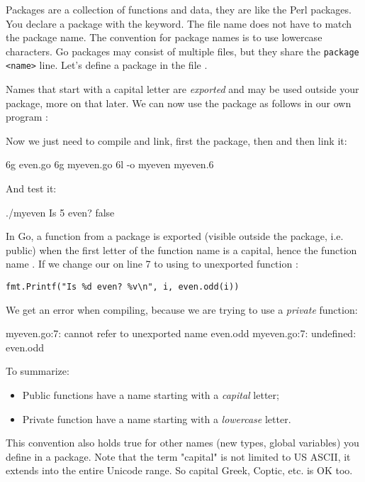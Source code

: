 \noindent{}Packages are a collection of functions and data, they are like the
Perl packages\cite{perl-packages}. You declare a package with the
 keyword. The file name does not
have to match the package name.
The convention for package names is to use
lowercase characters.
Go packages may consist of multiple files,
but they share the \lstinline{package <name>} line.
Let's define a package  in the file .


Names that start with a capital letter are \emph{exported} and may be used
outside your package, more on that later. We can now use
the package as follows in our own program :


\showremarks

Now we just need to compile and link, first the package, then  and
then link it:
\begin{display}
\pr 6g even.go			
\pr 6g myeven.go		
\pr 6l -o myeven myeven.6       
\end{display}
And test it:
\begin{display}
\pr ./myeven
Is 5 even? false
\end{display}

In Go, a function from a package is exported (visible
outside the package, i.e. public) when the first letter of the function name is a capital, hence
the function name . If we change our  on line
7 to using to unexported function :

\noindent\lstinline{fmt.Printf("Is %d even? %v\n", i, even.odd(i))}

We get an error when compiling, because we are trying to use a
\emph{private} function:
\begin{display}
myeven.go:7: cannot refer to unexported name even.odd
myeven.go:7: undefined: even.odd
\end{display}

\noindent{}To summarize:
\begin{itemize}
\item Public functions have a name starting with a \emph{capital}
letter;
\item Private function have a name starting with a \emph{lowercase} letter.
\end{itemize}
This convention also holds true for other names (new types, global
variables) you define in a package. Note that the term "capital" is not limited
to US ASCII, it extends into the entire Unicode range. So capital Greek, Coptic, etc. is OK too.

